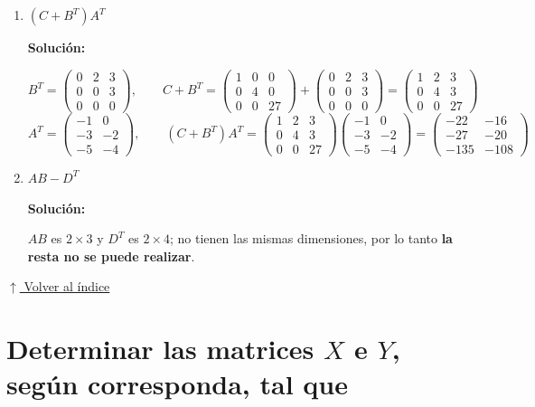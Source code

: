 \documentclass[12pt]{article}
\newcommand{\solucion}{%
    \vspace{0.8em}%
    \textbf{Solución:}%
}
\newcommand{\volverindice}{%
    \vspace{1em}%
    \begin{flushright}%
        \hyperlink{indice}{\small $\uparrow$ Volver al índice}%
    \end{flushright}%
}
\begin{document}
\begin{enumerate}[label=\alph*.-]
    \item $(C + B^T) A^T$

    \solucion
    \[
    B^T = \begin{pmatrix}0&2&3\\0&0&3\\0&0&0\end{pmatrix}, \qquad
    C + B^T =
    \begin{pmatrix}1&0&0\\0&4&0\\0&0&27\end{pmatrix}
    +
    \begin{pmatrix}0&2&3\\0&0&3\\0&0&0\end{pmatrix}
    =
    \begin{pmatrix}1&2&3\\0&4&3\\0&0&27\end{pmatrix}
    \]
    \[
    A^T = \begin{pmatrix}-1&0\\-3&-2\\-5&-4\end{pmatrix}, \qquad
    (C+B^T)A^T =
    \begin{pmatrix}1&2&3\\0&4&3\\0&0&27\end{pmatrix}
    \begin{pmatrix}-1&0\\-3&-2\\-5&-4\end{pmatrix}
    =
    \begin{pmatrix}-22&-16\\-27&-20\\-135&-108\end{pmatrix}
    \]

    \item $AB - D^T$

    \solucion

    $AB$ es $2\times3$ y $D^T$ es $2\times4$; no tienen las mismas dimensiones,
    por lo tanto \textbf{la resta no se puede realizar}.
\end{enumerate}

\volverindice
\newpage

\section{Determinar las matrices $X$ e $Y$, según corresponda, tal que}
\end{document}
